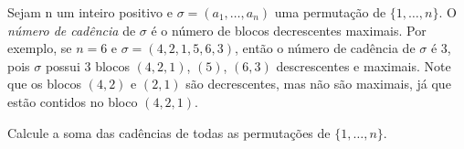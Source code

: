 Sejam n um inteiro positivo e $\sigma = (a_1, \dots, a_n)$ uma permutação de $\{1, \dots, n\}$. O \textit{número
de cadência} de $\sigma$ é o número de blocos decrescentes maximais. Por exemplo, se $n = 6$ e
$\sigma = (4, 2, 1, 5, 6, 3)$, então o número de cadência de $\sigma$ é $3$, pois $\sigma$ possui $3$ blocos $(4, 2, 1)$, $(5)$,
$(6, 3)$ descrescentes e maximais. Note que os blocos $(4, 2)$ e $(2, 1)$ são decrescentes, mas não
são maximais, já que estão contidos no bloco $(4, 2, 1)$.

Calcule a soma das cadências de todas as permutações de $\{1, \dots, n\}$.

